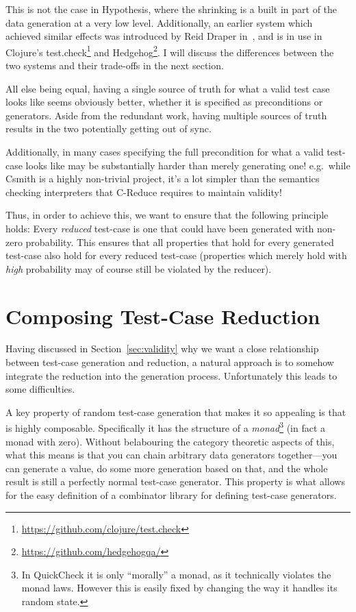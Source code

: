 This is not the case in Hypothesis,
where the shrinking is a built in part of the data generation at a very low level.
Additionally,
an earlier system which achieved similar effects was introduced by Reid Draper in~\cite{FreeShrinking},
and is in use in Clojure's test.check\footnote{\url{https://github.com/clojure/test.check}} and Hedgehog\footnote{\url{https://github.com/hedgehogqa/}}.
I will discuss the differences between the two systems and their trade-offs in the next section.

All else being equal,
having a single source of truth for what a valid test case looks like seems obviously better,
whether it is specified as preconditions or generators.
Aside from the redundant work,
having multiple sources of truth results in the two potentially getting out of sync.

Additionally,
in many cases specifying the full precondition for what a valid test-case looks like may be substantially harder than merely generating one!
e.g.\ while Csmith is a highly non-trivial project,
it's a lot simpler than the semantics checking interpreters that C-Reduce requires to maintain validity!

Thus,
in order to achieve this,
we want to ensure that the following principle holds:
Every \emph{reduced} test-case is one that could have been generated with non-zero probability.
This ensures that all properties that hold for every generated test-case also hold for every reduced test-case
(properties which merely hold with \emph{high} probability may of course still be violated by the reducer).

\section{Composing Test-Case Reduction}

Having discussed in Section~\ref{sec:validity} why we want a close relationship between test-case generation and reduction,
a natural approach is to somehow integrate the reduction into the generation process.
Unfortunately this leads to some difficulties.

A key property of random test-case generation that makes it so appealing is that is highly composable.
Specifically it has the structure of a \emph{monad}\footnote{
In QuickCheck it is only ``morally'' a monad,
as it technically violates the monad laws.
However this is easily fixed by changing the way it handles its random state.
} (in fact a monad with zero).
Without belabouring the category theoretic aspects of this,
what this means is that you can chain arbitrary data generators together---you
can generate a value,
do some more generation based on that,
and the whole result is still a perfectly normal test-case generator.
This property is what allows for the easy definition of a combinator library for defining test-case generators.

